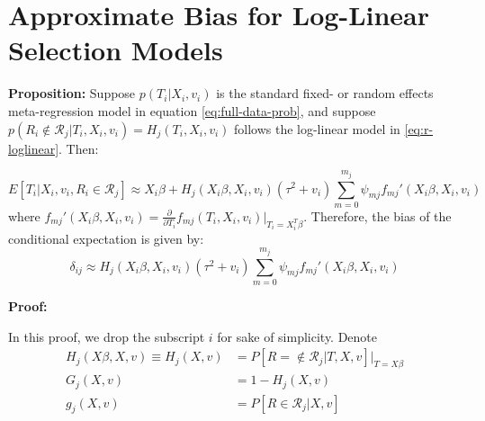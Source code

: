 \documentclass[
]{article}
\begin{document}
\clearpage

\appendix

\hypertarget{approximate-bias-for-log-linear-selection-models-1}{%
\section{Approximate Bias for Log-Linear Selection Models}\label{approximate-bias-for-log-linear-selection-models-1}}

\textbf{Proposition:} Suppose \(p(T_i | X_i, v_i)\) is the standard fixed- or random effects meta-regression model in equation \eqref{eq:full-data-prob}, and suppose \(p(R_i \not\in \mathcal{R}_j | T_i, X_i, v_i) = H_j(T_i, X_i, v_i)\) follows the log-linear model in \eqref{eq:r-loglinear}. Then:

\begin{equation}
E[T_i | X_i, v_i, R_i \in \mathcal{R}_j] \approx X_i\beta + H_j(X_i\beta, X_i, v_i)(\tau^2 + v_i)\sum_{m = 0}^{m_j} \psi_{mj} f_{mj}'(X_i \beta, X_i, v_i)
\label{eq:conditional_expectation}
\end{equation}
where \(f_{mj}'(X_i \beta, X_i, v_i) = \frac{\partial}{\partial T_i} f_{mj}(T_i, X_i, v_i)\rvert_{T_i = X_i^T \beta}\).
Therefore, the bias of the conditional expectation is given by:
\begin{equation}
\delta_{ij} \approx H_j(X_i \beta, X_i, v_i)(\tau^2 + v_i)\sum_{m = 0}^{m_j} \psi_{mj} f_{mj}'(X_i \beta, X_i, v_i)
\label{eq:conditional-bias-appendix}
\end{equation}

\textbf{Proof:}

In this proof, we drop the subscript \(i\) for sake of simplicity.
Denote
\begin{align*}
H_j(X\beta, X, v) \equiv H_j(X, v) 
  & = P[R =\not\in \mathcal{R}_j | T, X, v] \rvert_{T = X\beta} \\
G_j(X, v) 
  & = 1 - H_j(X, v) \\
g_j(X, v)
  & = P[R \in \mathcal{R}_j | X, v]
\end{align*}
\end{document}
